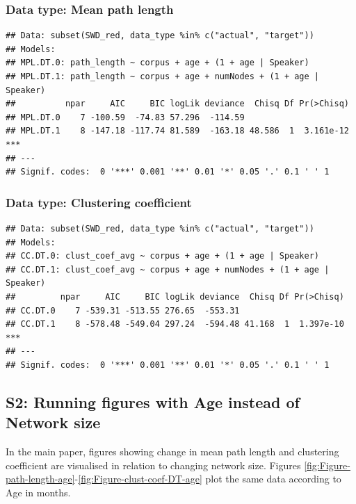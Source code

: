 \documentclass[
  man,floatsintext]{apa6}
\begin{document}
\hypertarget{data-type-mean-path-length}{%
\subsubsection{Data type: Mean path length}\label{data-type-mean-path-length}}

\begin{verbatim}
## Data: subset(SWD_red, data_type %in% c("actual", "target"))
## Models:
## MPL.DT.0: path_length ~ corpus + age + (1 + age | Speaker)
## MPL.DT.1: path_length ~ corpus + age + numNodes + (1 + age | Speaker)
##          npar     AIC     BIC logLik deviance  Chisq Df Pr(>Chisq)    
## MPL.DT.0    7 -100.59  -74.83 57.296  -114.59                         
## MPL.DT.1    8 -147.18 -117.74 81.589  -163.18 48.586  1  3.161e-12 ***
## ---
## Signif. codes:  0 '***' 0.001 '**' 0.01 '*' 0.05 '.' 0.1 ' ' 1
\end{verbatim}

\hypertarget{data-type-clustering-coefficient}{%
\subsubsection{Data type: Clustering coefficient}\label{data-type-clustering-coefficient}}

\begin{verbatim}
## Data: subset(SWD_red, data_type %in% c("actual", "target"))
## Models:
## CC.DT.0: clust_coef_avg ~ corpus + age + (1 + age | Speaker)
## CC.DT.1: clust_coef_avg ~ corpus + age + numNodes + (1 + age | Speaker)
##         npar     AIC     BIC logLik deviance  Chisq Df Pr(>Chisq)    
## CC.DT.0    7 -539.31 -513.55 276.65  -553.31                         
## CC.DT.1    8 -578.48 -549.04 297.24  -594.48 41.168  1  1.397e-10 ***
## ---
## Signif. codes:  0 '***' 0.001 '**' 0.01 '*' 0.05 '.' 0.1 ' ' 1
\end{verbatim}

\hypertarget{s2-running-figures-with-age-instead-of-network-size}{%
\subsection{S2: Running figures with Age instead of Network size}\label{s2-running-figures-with-age-instead-of-network-size}}

In the main paper, figures showing change in mean path length and clustering coefficient are visualised in relation to changing network size. Figures \ref{fig:Figure-path-length-age}-\ref{fig:Figure-clust-coef-DT-age} plot the same data according to Age in months.
\end{document}
